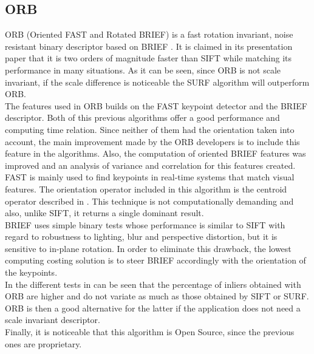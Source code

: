 \subsection*{ORB}
ORB (Oriented FAST and Rotated BRIEF) is a fast rotation invariant, noise resistant binary descriptor based on BRIEF \cite{orb}.
It is claimed in its presentation paper that it is two orders of magnitude faster than SIFT while matching its performance in many situations. As it can be seen, since ORB is not scale invariant, if the scale difference is noticeable the SURF algorithm will outperform ORB. 
\\

The features used in ORB builds on the FAST\cite{fast} keypoint detector and the BRIEF\cite{brief} descriptor. Both of this previous algorithms offer a good performance and computing time relation. Since neither of them had the orientation taken into account, the main improvement made by the ORB developers is to include this feature in the algorithms. Also, the computation of oriented BRIEF features was improved and an analysis of variance and correlation for this features created. 
\\

FAST is mainly used to find keypoints in real-time systems that match visual features. The orientation operator included in this algorithm is the centroid operator described in \cite{orientation_corners}. This technique is not computationally demanding and also, unlike SIFT, it returns a single dominant result. 
\\

BRIEF uses simple binary tests whose performance is similar to SIFT with regard to robustness to lighting, blur and perspective distortion, but it is sensitive to in-plane rotation. In order to eliminate this drawback, the lowest computing costing solution is to steer BRIEF accordingly with the orientation of the keypoints. 
\\

In the different tests in \cite{orb} can be seen that the percentage of inliers obtained with ORB are higher and do not variate as much as those obtained by SIFT or SURF. 
ORB is then a good alternative for the latter if the application does not need a scale invariant descriptor. 
\\

Finally, it is noticeable that this algorithm is Open Source, since the previous ones are proprietary. 
